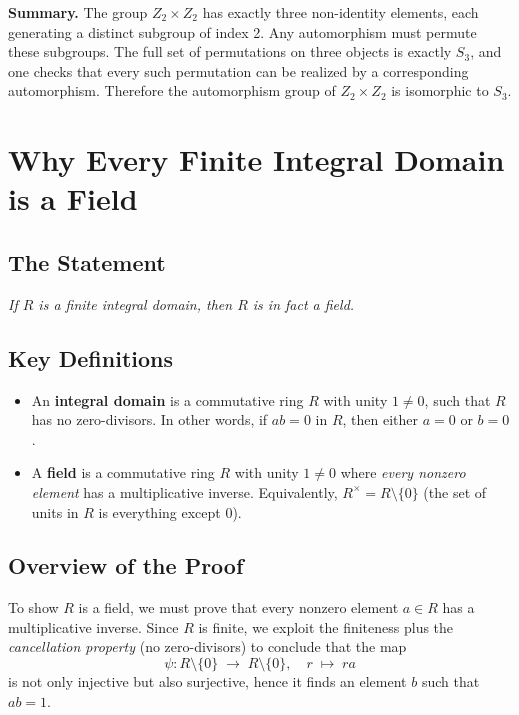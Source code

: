 \documentclass[12pt]{article}
\theoremstyle{definition} %
\theoremstyle{plain} %
\begin{document}
\bigskip

\noindent
\textbf{Summary.}  
The group $Z_2 \times Z_2$ has exactly three non-identity elements, each generating a distinct subgroup of index 2.  Any automorphism must permute these subgroups.  The full set of permutations on three objects is exactly $S_3$, and one checks that every such permutation can be realized by a corresponding automorphism.  Therefore the automorphism group of $Z_2 \times Z_2$ is isomorphic to $S_3$.

\section*{Why Every Finite Integral Domain is a Field}

\subsection*{The Statement}
\emph{If $R$ is a finite integral domain, then $R$ is in fact a field.}

\subsection*{Key Definitions}
\begin{itemize}
    \item An \textbf{integral domain} is a commutative ring $R$ with unity $1 \neq 0$, such that $R$ has no zero-divisors. 
      In other words, if $ab = 0$ in $R$, then either $a = 0$ or $b = 0$.
    \item A \textbf{field} is a commutative ring $R$ with unity $1 \neq 0$ where \emph{every nonzero element} has a multiplicative inverse. 
      Equivalently, $R^\times = R\setminus \{0\}$ (the set of units in $R$ is everything except $0$).
\end{itemize}

\subsection*{Overview of the Proof}
To show $R$ is a field, we must prove that every nonzero element $a \in R$ has a multiplicative inverse.  
Since $R$ is finite, we exploit the finiteness plus the \emph{cancellation property} (no zero-divisors) to conclude that 
the map 
\[
  \psi : R \setminus \{0\}\;\longrightarrow\; R \setminus \{0\}, 
  \quad
  r \;\mapsto\; ra
\]
is not only injective but also surjective, hence it finds an element $b$ such that $ab = 1$.
\end{document}
